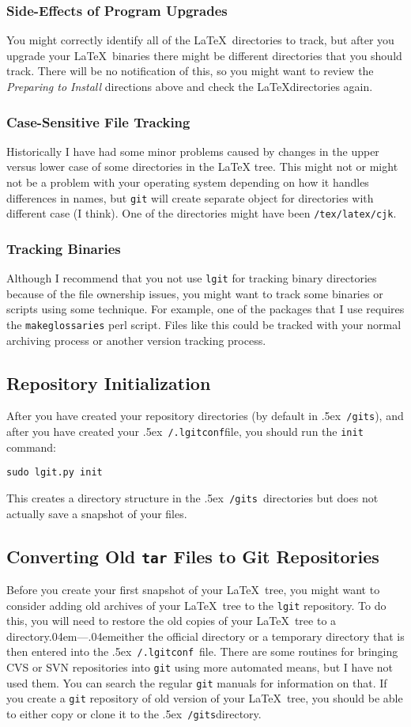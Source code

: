 \documentclass{ltxdoc}
\def\bobtilde{\lower.5ex\hbox{\tt \string~}}%
\def\ucmd#1{{\tt {#1}}}
\def\lgitconf{\bobtilde\ucmd{/.lgitconf}}
\def\mygits{\bobtilde\ucmd{/gits}}
\def\dash{\kern.04em{}{---}\kern.04em{}}
\begin{document}
\subsubsection{Side-Effects of Program Upgrades}
You might correctly identify all of the \LaTeX\ directories to track, but after you upgrade your \LaTeX\ binaries there might be different directories that you should track.  There will be no notification of this, so you might want to review the \emph{Preparing to Install} directions above and check the \LaTeX directories again.

\subsubsection{Case-Sensitive File Tracking}
Historically I have had some minor problems caused by changes in the upper versus lower case of some directories in the LaTeX tree.  This might not or might not be a problem with your operating system depending on how it handles differences in names, but \ucmd{git} will create separate object for directories with different case (I think).  One of the directories might have been \ucmd{/tex/latex/cjk}.

\subsubsection{Tracking Binaries}
Although I recommend that you not use \ucmd{lgit} for tracking binary directories because of the file ownership issues, you might want to track some binaries or scripts using some technique.  For example, one of the packages that I use requires the \ucmd{makeglossaries} perl script.  Files like this could be tracked with your normal archiving process or another version tracking process.
\subsection{Repository Initialization}
After you have created your repository directories (by default in \mygits), and after you have created your \lgitconf file, you should run the \ucmd{init} command:
\begin{verbatim}
sudo lgit.py init
\end{verbatim}
This creates a directory structure in the \mygits\ directories but does not actually save a snapshot of your files.
\subsection{Converting Old \ucmd{tar} Files to Git Repositories}
Before you create your first snapshot of your \LaTeX\ tree, you might want to consider adding old archives of your \LaTeX\ tree to the \ucmd{lgit} repository.  To do this, you will need to restore the old copies of your \LaTeX\ tree to a directory\dash either the official directory or a temporary directory that is then entered into the \lgitconf\ file.  There are some routines for bringing CVS or SVN repositories into \ucmd{git} using more automated means, but I have not used them. You can search the regular \ucmd{git} manuals for information on that.  If you create a \ucmd{git} repository of old version of your \LaTeX\ tree, you should be able to either copy or clone it to the \mygits directory.
\end{document}
